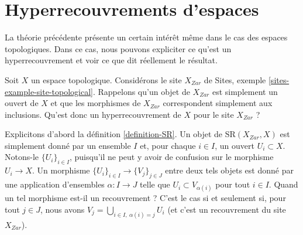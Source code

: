 \section{Hyperrecouvrements d'espaces}
\label{section-hypercoverings-spaces}

\noindent
La théorie précédente présente un certain intérêt même dans le cas des espaces
topologiques. Dans ce cas, nous pouvons expliciter ce qu'est un hyperrecouvrement et voir
ce que dit réellement le résultat.

\medskip\noindent
Soit $X$ un espace topologique. Considérons le site $X_{Zar}$ de
Sites, exemple \ref{sites-example-site-topological}. Rappelons
qu'un objet de $X_{Zar}$ est simplement un ouvert de $X$ et que les morphismes
de $X_{Zar}$ correspondent simplement aux inclusions. Qu'est donc un
hyperrecouvrement de $X$ pour le site $X_{Zar}$ ?

\medskip\noindent
Explicitons d'abord la définition \ref{definition-SR}.
Un objet de $\text{SR}(X_{Zar}, X)$ est simplement donné par un ensemble
$I$ et, pour chaque $i \in I$, un ouvert $U_i \subset X$.
Notons-le $\{U_i\}_{i \in I}$, puisqu'il ne peut y avoir de
confusion sur le morphisme $U_i \to X$.
Un morphisme $\{U_i\}_{i \in I} \to \{V_j\}_{j \in J}$
entre deux tels objets est donné par une application d'ensembles
$\alpha : I \to J$ telle que $U_i \subset V_{\alpha(i)}$ pour tout
$i \in I$. Quand un tel morphisme est-il un recouvrement ? C'est le cas
si et seulement si, pour tout $j \in J$, nous avons
$V_j = \bigcup_{i\in I, \ \alpha(i) = j} U_i$ (et c'est
un recouvrement du site $X_{Zar}$).

